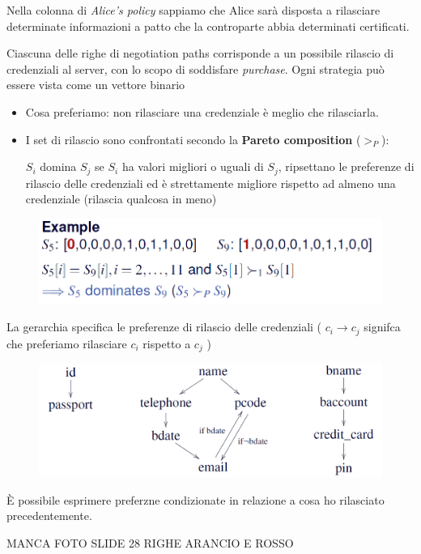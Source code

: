 \documentclass{report}
\begin{document}
Nella colonna di \textit{Alice's policy} sappiamo che Alice sarà disposta a rilasciare determinate informazioni a patto che la controparte abbia determinati certificati.

\noindent Ciascuna delle righe di negotiation paths corrisponde a un possibile rilascio di credenziali al server, con lo scopo di soddisfare \textit{purchase}.
Ogni strategia può essere vista come un vettore binario

\begin{itemize}
    \item Cosa preferiamo: non rilasciare una credenziale è meglio che rilasciarla.
    \item I set di rilascio sono confrontati secondo la \textbf{Pareto composition} ($>_P$): 
    
    $ S_i $ domina $ S_j $ se $ S_i $ ha valori migliori o uguali di $ S_j $, ripsettano le preferenze di rilascio delle credenziali ed
    è strettamente migliore rispetto ad almeno una credenziale (rilascia qualcosa in meno)
\end{itemize}
\begin{figure}[ht]
    \centering
    \includegraphics[width=0.85\linewidth]{images/Pareto.png}
\end{figure}

La gerarchia specifica le preferenze di rilascio delle credenziali ( $ c_i \rightarrow c_j $ signifca che preferiamo rilasciare $ c_i $ rispetto a $ c_j$ )
\begin{figure}[ht]
    \centering
    \includegraphics[width=0.85\linewidth]{images/Gerarchia.png}
\end{figure}
È possibile esprimere preferzne condizionate in relazione a cosa ho rilasciato precedentemente.

MANCA FOTO SLIDE 28 RIGHE ARANCIO E ROSSO
\end{document}
